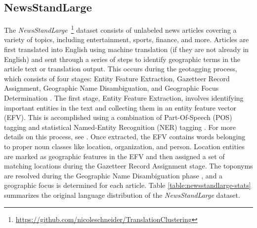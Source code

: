 \subsection{NewsStandLarge}
The \emph{NewsStandLarge}~\footnote{\url{https://github.com/nicoleschneider/TranslationClustering}} dataset consists of  unlabeled news articles covering a variety of topics, including entertainment, sports, finance, and more.
Articles are first translated into English using machine translation (if they are not already in English) and  sent through a series of steps to identify geographic terms in the article text or translation output. 
This occurs during the geotagging process, which consists of four stages: Entity Feature Extraction, Gazetteer Record Assignment, Geographic Name Disambiguation, and Geographic Focus Determination \cite{Teit08}. 
The first stage, Entity Feature Extraction, involves identifying important entities in the text and collecting them in an entity feature vector (EFV). 
This is accomplished using a combination of Part-Of-Speech (POS) tagging and statistical Named-Entity Recognition (NER) tagging \cite{NER}. 
For more details on this process, see \cite{Same09d, Lieb07, Ho12}. 
Once extracted, the EFV contains words belonging to proper noun classes like location, organization, and person. 
Location entities are marked as geographic features in the EFV and then assigned a set of matching locations during the Gazetteer Record Assignment stage.
The toponyms are resolved during the Geographic Name Disambiguation phase \cite{Leid11, Lieb10b, Lieb11, Lieb12, Same14b, Schn21}, and a geographic focus is determined for each article.
Table \ref{table:newsstandlarge-stats} summarizes the original language distribution of the \emph{NewsStandLarge} dataset.


